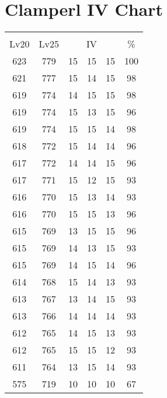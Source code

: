 \documentclass{article}%
\begin{document}
%
\normalsize%
\section{Clamperl IV Chart}%
\label{sec:Clamperl IV Chart}%
\renewcommand{\arraystretch}{1.5}%
\begin{tabular}{|c|c|c|c|c|c|}%
\hline%
\multicolumn{6}{|c|}{\textcolor{white}{ 
\linebreak{Clamperl}
}%
\cellcolor{black}}\\%
\multicolumn{1}{|c}{Lv20}&\multicolumn{1}{c|}{Lv25}&\multicolumn{3}{c|}{IV}&\multicolumn{1}{|c|}{\%}\\%
\hline%
\rowcolor{color100}%
623&779&15&15&15&100\\%
\hline%
\rowcolor{color98}%
621&777&15&14&15&98\\%
\hline%
\rowcolor{color98}%
619&774&14&15&15&98\\%
\hline%
\rowcolor{color96}%
619&774&15&13&15&96\\%
\hline%
\rowcolor{color98}%
619&774&15&15&14&98\\%
\hline%
\rowcolor{color96}%
618&772&15&14&14&96\\%
\hline%
\rowcolor{color96}%
617&772&14&14&15&96\\%
\hline%
\rowcolor{color93}%
617&771&15&12&15&93\\%
\hline%
\rowcolor{color93}%
616&770&15&13&14&93\\%
\hline%
\rowcolor{color96}%
616&770&15&15&13&96\\%
\hline%
\rowcolor{color96}%
615&769&13&15&15&96\\%
\hline%
\rowcolor{color93}%
615&769&14&13&15&93\\%
\hline%
\rowcolor{color96}%
615&769&14&15&14&96\\%
\hline%
\rowcolor{color93}%
614&768&15&14&13&93\\%
\hline%
\rowcolor{color93}%
613&767&13&14&15&93\\%
\hline%
\rowcolor{color93}%
613&766&14&14&14&93\\%
\hline%
\rowcolor{color93}%
612&765&14&15&13&93\\%
\hline%
\rowcolor{color93}%
612&765&15&15&12&93\\%
\hline%
\rowcolor{color93}%
611&764&13&15&14&93\\%
\hline%
\rowcolor{color91}%
575&719&10&10&10&67\\%
\end{tabular}

%
\end{document}
